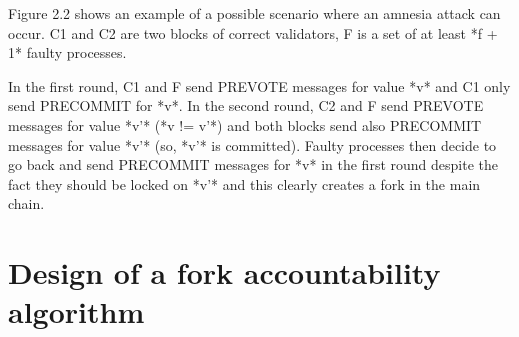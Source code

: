 \documentclass[a4paper,11pt,oneside]{report}
\begin{document}
\begin{markdown}

Figure 2.2 shows an example of a possible scenario where an amnesia attack can occur.
C1 and C2 are two blocks of correct validators, F is a set of at least *f + 1* faulty processes.

In the first round, C1 and F send PREVOTE messages for value *v* and C1 only send PRECOMMIT for *v*. 
In the second round, C2 and F send PREVOTE messages for value *v'* (*v != v'*) 
and both blocks send also PRECOMMIT messages for value *v'* (so, *v'* is committed).
Faulty processes then decide to go back and send PRECOMMIT messages for *v* in the first round despite the fact they should be locked on *v'* and this clearly creates a fork in the main chain.

\end{markdown}

\chapter{Design of a fork accountability algorithm}
\end{document}
